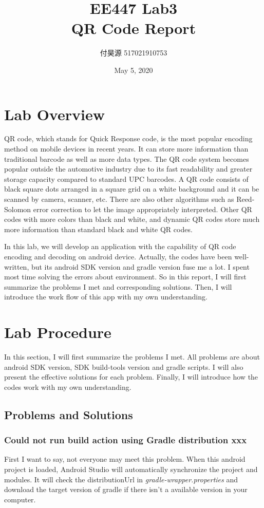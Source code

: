 \documentclass{article}
\title{\textbf{EE447 Lab3 \\ QR Code Report}}
\author{付昊源 517021910753}
\date{May 5, 2020}
\begin{document}
\maketitle

\section{Lab Overview}
QR code, which stands for Quick Response code, is the most popular encoding method on mobile devices in recent years. It can store more information than traditional barcode as well as more data types. The QR code system becomes popular outside the automotive industry due to its fast readability and greater storage capacity compared to standard UPC barcodes. A QR code consists of black square dots arranged in a square grid on a white background and it can be scanned by camera, scanner, etc. There are also other algorithms such as Reed-Solomon error correction to let the image appropriately interpreted. Other QR codes with more colors than black and white, and dynamic QR codes store much more information than standard black and white QR codes.

In this lab, we will develop an application with the capability of QR code encoding and decoding on android device. Actually, the codes have been well-written, but its android SDK version and gradle version fuse me a lot. I spent most time solving the errors about environment. So in this report, I will first summarize the problems I met and corresponding solutions. Then, I will introduce the work flow of this app with my own understanding.

\section{Lab Procedure}
In this section, I will first summarize the problems I met. All problems are about android SDK version, SDK build-tools version and gradle scripts. I will also present the effective solutions for each problem. Finally, I will introduce how the codes work with my own understanding.

\subsection{Problems and Solutions}
\subsubsection{Could not run build action using Gradle distribution xxx}
First I want to say, not everyone may meet this problem. When this android project is loaded, Android Studio will automatically synchronize the project and modules. It will check the distributionUrl in \textit{gradle-wrapper.properties} and download the target version of gradle if there isn't a available version in your computer.
\end{document}
